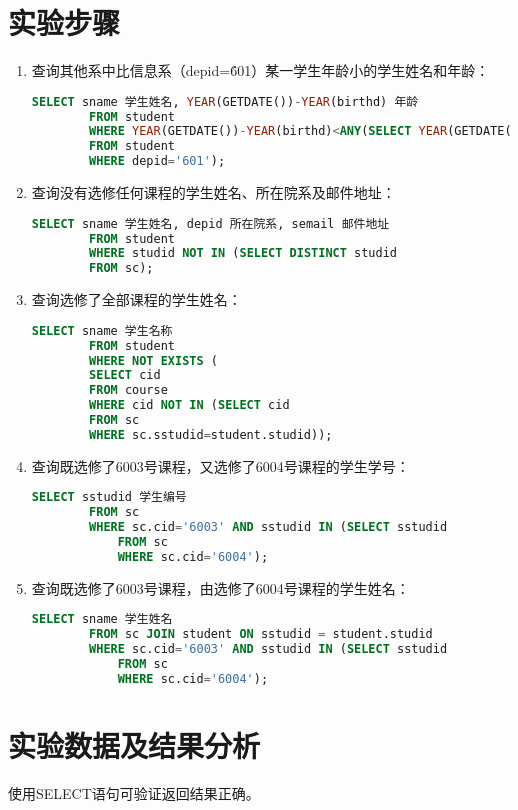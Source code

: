 \documentclass[a4paper]{uestcreport}
\begin{document}
\section{实验步骤}
\begin{enumerate}
    \item 查询其他系中比信息系（depid=\'601\'）某一学生年龄小的学生姓名和年龄：
          \begin{lstlisting}[language=SQL]
        SELECT sname 学生姓名, YEAR(GETDATE())-YEAR(birthd) 年龄
        FROM student
        WHERE YEAR(GETDATE())-YEAR(birthd)<ANY(SELECT YEAR(GETDATE())-YEAR(birthd)
        FROM student
        WHERE depid='601');
    \end{lstlisting}
    \item 查询没有选修任何课程的学生姓名、所在院系及邮件地址：
          \begin{lstlisting}[language=SQL]
        SELECT sname 学生姓名, depid 所在院系, semail 邮件地址
        FROM student
        WHERE studid NOT IN (SELECT DISTINCT studid
        FROM sc);
    \end{lstlisting}
    \item 查询选修了全部课程的学生姓名：
          \begin{lstlisting}[language=SQL]
        SELECT sname 学生名称
        FROM student
        WHERE NOT EXISTS (
        SELECT cid
        FROM course
        WHERE cid NOT IN (SELECT cid
        FROM sc
        WHERE sc.sstudid=student.studid));
    \end{lstlisting}
    \item 查询既选修了6003号课程，又选修了6004号课程的学生学号：
          \begin{lstlisting}[language=SQL]
        SELECT sstudid 学生编号
        FROM sc
        WHERE sc.cid='6003' AND sstudid IN (SELECT sstudid
            FROM sc
            WHERE sc.cid='6004');
    \end{lstlisting}
    \item 查询既选修了6003号课程，由选修了6004号课程的学生姓名：
          \begin{lstlisting}[language=SQL]
        SELECT sname 学生姓名
        FROM sc JOIN student ON sstudid = student.studid
        WHERE sc.cid='6003' AND sstudid IN (SELECT sstudid
            FROM sc
            WHERE sc.cid='6004');
    \end{lstlisting}
\end{enumerate}

\section{实验数据及结果分析}
使用SELECT语句可验证返回结果正确。
\end{document}
